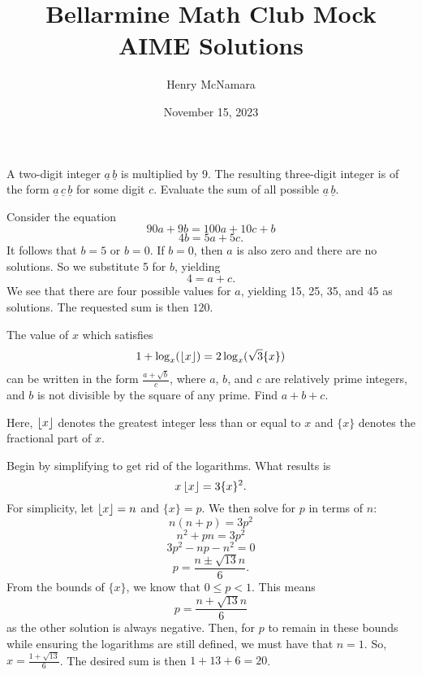 \documentclass[11pt]{scrartcl}
\title{Bellarmine Math Club Mock AIME Solutions}
\author{Henry McNamara}
\date{November 15, 2023}
\begin{document}
\maketitle

\pagebreak

\begin{problem}
    A two-digit integer $\underline{a} \, \underline{b}$ is multiplied by 9. The resulting three-digit integer is of the form $\underline{a} \, \underline{c} \, \underline{b}$ for some digit $c$. Evaluate the sum of all possible $\underline{a} \, \underline{b}$.
\end{problem}

\begin{soln}
    Consider the equation
    \[90a + 9b = 100a + 10c + b\]
    \[4b = 5a + 5c.\]
    It follows that $b = 5$ or $b = 0$. If $b = 0$, then $a$ is also zero and there are no solutions. So we substitute 5 for $b$, yielding
    \[4 = a + c.\]
    We see that there are four possible values for $a$, yielding 15, 25, 35, and 45 as solutions. The requested sum is then $120$.
\end{soln}

\begin{problem}
    The value of $x$ which satisfies
    \[1 + \log_{x}(\left\lfloor x \right\rfloor) = 2\log_{x}(\sqrt{3}\{x\})\]
    can be written in the form $\frac{a + \sqrt{b}}{c}$, where $a$, $b$, and $c$ are relatively prime integers, and $b$ is not divisible by the square of any prime. Find $a + b + c$.
    
    Here, $\left\lfloor x \right\rfloor$ denotes the greatest integer less than or equal to $x$ and $\{x\}$ denotes the fractional part of $x$.    
\end{problem}

\begin{soln}
    Begin by simplifying to get rid of the logarithms. What results is
    \[x\left\lfloor x \right\rfloor = 3\{x\}^{2}.\]
    For simplicity, let $\left\lfloor x \right\rfloor = n$ and $\{x\} = p$. We then solve for $p$ in terms of $n$:
    \[n(n + p) = 3p^{2}\]
    \[n^{2} + pn = 3p^{2}\]
    \[3p^{2} - np - n^{2} = 0\]
    \[p = \frac{n \pm \sqrt{13}n}{6}.\]
    From the bounds of $\{x\}$, we know that $0 \leq p < 1$. This means
    \[p = \frac{n + \sqrt{13}n}{6}\]
    as the other solution is always negative. Then, for $p$ to remain in these bounds while ensuring the logarithms are still defined, we must have that $n = 1$. So, $x = \frac{1 + \sqrt{13}}{6}$. The desired sum is then $1 + 13 + 6 = 20$. 
\end{soln}
\end{document}

